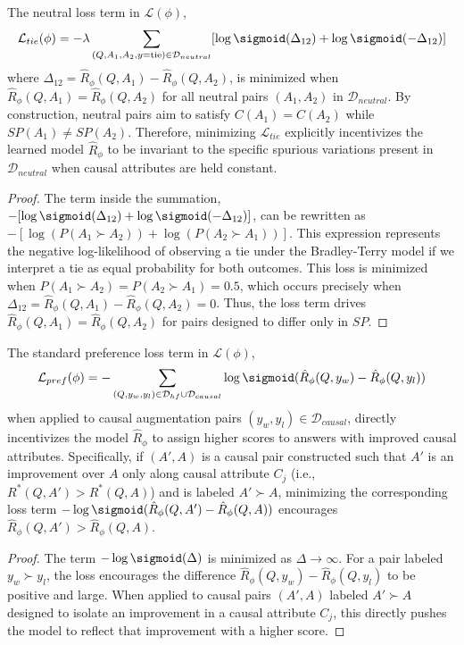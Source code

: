 \begin{proposition}
\label{prop:neutral_constraint}
The neutral loss term in $\mathcal{L}(\phi)$,
\[ \mathcal{L}_{tie}(\phi) = - \lambda \sum_{(Q, A_1, A_2, y=\text{tie})\in \mathcal{D}_{neutral}} [ \log \sigmoid(\Delta_{12}) + \log \sigmoid(-\Delta_{12}) ] \]
where $\Delta_{12} = \hat{R}_\phi(Q, A_1) - \hat{R}_\phi(Q, A_2)$, is minimized when $\hat{R}_\phi(Q, A_1) = \hat{R}_\phi(Q, A_2)$ for all neutral pairs $(A_1, A_2)$ in $\mathcal{D}_{neutral}$. By construction, neutral pairs aim to satisfy $C(A_1) = C(A_2)$ while $SP(A_1) \neq SP(A_2)$. Therefore, minimizing $\mathcal{L}_{tie}$ explicitly incentivizes the learned model $\hat{R}_\phi$ to be invariant to the specific spurious variations present in $\mathcal{D}_{neutral}$ when causal attributes are held constant.

\begin{proof}
The term inside the summation, $-[\log \sigmoid(\Delta_{12}) + \log \sigmoid(-\Delta_{12})]$, can be rewritten as $-[\log(P(A_1 \succ A_2)) + \log(P(A_2 \succ A_1))]$. This expression represents the negative log-likelihood of observing a tie under the Bradley-Terry model if we interpret a tie as equal probability for both outcomes. This loss is minimized when $P(A_1 \succ A_2) = P(A_2 \succ A_1) = 0.5$, which occurs precisely when $\Delta_{12} = \hat{R}_\phi(Q, A_1) - \hat{R}_\phi(Q, A_2) = 0$. Thus, the loss term drives $\hat{R}_\phi(Q, A_1) = \hat{R}_\phi(Q, A_2)$ for pairs designed to differ only in $SP$.
\end{proof}
\end{proposition}

\begin{proposition}
\label{prop:causal_constraint}
The standard preference loss term in $\mathcal{L}(\phi)$,
\[ \mathcal{L}_{pref}(\phi) = - \sum_{(Q, y_w, y_l) \in \mathcal{D}_{hf} \cup \mathcal{D}_{causal}} \log \sigmoid(\hat{R}_\phi(Q, y_w) - \hat{R}_\phi(Q, y_l)) \]
when applied to causal augmentation pairs $(y_w, y_l) \in \mathcal{D}_{causal}$, directly incentivizes the model $\hat{R}_\phi$ to assign higher scores to answers with improved causal attributes. Specifically, if $(A', A)$ is a causal pair constructed such that $A'$ is an improvement over $A$ only along causal attribute $C_j$ (i.e., $R^*(Q, A') > R^*(Q, A)$) and is labeled $A' \succ A$, minimizing the corresponding loss term $-\log \sigmoid(\hat{R}_\phi(Q, A') - \hat{R}_\phi(Q, A))$ encourages $\hat{R}_\phi(Q, A') > \hat{R}_\phi(Q, A)$.

\begin{proof}
The term $-\log \sigmoid(\Delta)$ is minimized as $\Delta \to \infty$. For a pair labeled $y_w \succ y_l$, the loss encourages the difference $\hat{R}_\phi(Q, y_w) - \hat{R}_\phi(Q, y_l)$ to be positive and large. When applied to causal pairs $(A', A)$ labeled $A' \succ A$ designed to isolate an improvement in a causal attribute $C_j$, this directly pushes the model to reflect that improvement with a higher score.
\end{proof}
\end{proposition}

